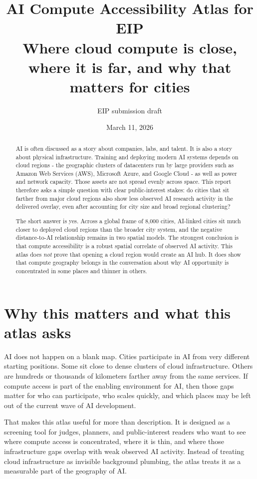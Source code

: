 \documentclass[11pt]{article}
\title{\textbf{AI Compute Accessibility Atlas for EIP}\\
\large Where cloud compute is close, where it is far, and why that matters for cities}
\author{EIP submission draft}
\date{March 11, 2026}
\begin{document}
\maketitle

\begin{abstract}
AI is often discussed as a story about companies, labs, and talent. It is also a story about physical infrastructure. Training and deploying modern AI systems depends on cloud regions - the geographic clusters of datacenters run by large providers such as Amazon Web Services (AWS), Microsoft Azure, and Google Cloud - as well as power and network capacity. Those assets are not spread evenly across space. This report therefore asks a simple question with clear public-interest stakes: do cities that sit farther from major cloud regions also show less observed AI research activity in the delivered overlay, even after accounting for city size and broad regional clustering?

The short answer is yes. Across a global frame of 8,000 cities, AI-linked cities sit much closer to deployed cloud regions than the broader city system, and the negative distance-to-AI relationship remains in two spatial models. The strongest conclusion is that compute accessibility is a robust spatial correlate of observed AI activity. This atlas does \emph{not} prove that opening a cloud region would create an AI hub. It does show that compute geography belongs in the conversation about why AI opportunity is concentrated in some places and thinner in others.
\end{abstract}

\section{Why this matters and what this atlas asks}
AI does not happen on a blank map. Cities participate in AI from very different starting positions. Some sit close to dense clusters of cloud infrastructure. Others are hundreds or thousands of kilometers farther away from the same services. If compute access is part of the enabling environment for AI, then those gaps matter for who can participate, who scales quickly, and which places may be left out of the current wave of AI development.

That makes this atlas useful for more than description. It is designed as a screening tool for judges, planners, and public-interest readers who want to see where compute access is concentrated, where it is thin, and where those infrastructure gaps overlap with weak observed AI activity. Instead of treating cloud infrastructure as invisible background plumbing, the atlas treats it as a measurable part of the geography of AI.
\end{document}
